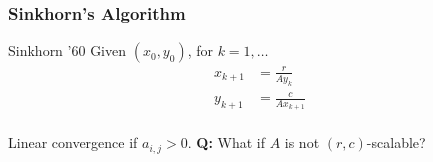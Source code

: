 \documentclass{beamer}
\begin{document}
\begin{frame}
  \frametitle{Sinkhorn's Algorithm}

  \begin{block}{Sinkhorn '60}
    Given $(x_0, y_0)$, for $k=1,\dots$
    \begin{equation}
      \begin{aligned}
        x_{k+1}&= \frac{r}{A y_k} \\
        y_{k+1}&= \frac{c}{A x_{k+1}} \\
      \end{aligned}
    \end{equation}
  \end{block}
  Linear convergence if $a_{i,j} > 0$.
  \textbf{Q:} What if $A$ is not $(r,c)$-scalable?
\end{frame}
\end{document}

